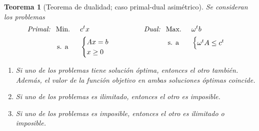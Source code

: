 \documentclass[11pt]{report}
\theoremstyle{mytheorem}
\newtheorem{theorem}{Teorema}
\theoremstyle{mydefinition}
\theoremstyle{myexample}
\newenvironment{ctheorem} %
  {\begin{mdframed}[
        linewidth=3pt,
        linecolor=c2,
        bottomline=false,
        topline=false,
        rightline=false,
        innerrightmargin=0pt,
        innertopmargin=0pt,
        innerbottommargin=0pt,
        innerleftmargin=1em,
        skipabove=\baselineskip]
    \begin{theorem}}
  {\end{theorem}\end{mdframed}}
\begin{document}
\begin{ctheorem}[Teorema de dualidad; caso primal-dual asimétrico]
Se consideran los problemas
\[\begin{aligned}[t]
\textit{\textit{Primal: }} \ &\textup{Min. } && c^tx \\
& \, \textup{s. a} &&\begin{cases}
    Ax=b \\
    x \geq 0 \\
\end{cases}
\end{aligned} \qquad \qquad \begin{aligned}[t]
\textit{\textit{Dual: }} \ &\textup{Max. } && \omega^t b \\
& \; \textup{s. a} &&\begin{cases}
    \omega^t A \leq c^t
\end{cases}
\end{aligned}\]
\begin{enumerate}
    \item Si uno de los problemas tiene solución óptima, entonces el otro también. Además, el valor de la función objetivo en ambas soluciones óptimas coincide.
    \item Si uno de los problemas es ilimitado, entonces el otro es imposible.
    \item Si uno de los problemas es imposible, entonces el otro es ilimitado o imposible.
\end{enumerate}
\end{ctheorem}
\end{document}
